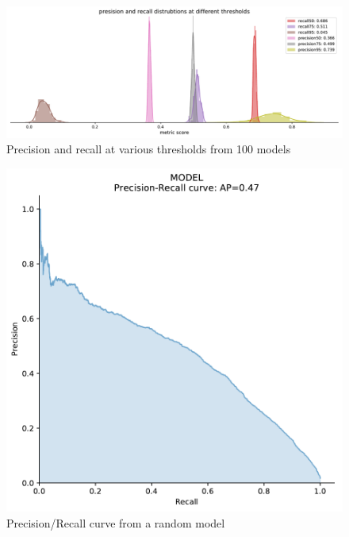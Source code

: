 \documentclass[a4paper]{article}
\begin{document}
\begin{figure}[!htb]
	\centering
	\includegraphics[scale=0.4]{recall_prec_out_20.pdf}
    \caption{\footnotesize{Precision and recall at various thresholds from 100 models}}%
\end{figure}


\begin{figure}[!htb]
	\centering
	\includegraphics[scale=0.4]{prc_out_20.pdf}
    \caption{\footnotesize{Precision/Recall curve from a random model}}%
\end{figure}
\end{document}
